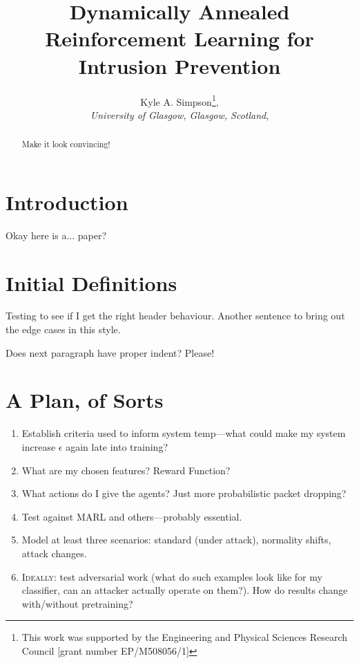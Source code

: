 \documentclass[conference,10pt]{IEEEtran}
\title{Dynamically Annealed Reinforcement Learning for Intrusion Prevention}
\author{Kyle A. Simpson\thanks{This work was supported by the Engineering and Physical Sciences
		Research Council [grant number EP/M508056/1]},\\\emph{University of Glasgow, Glasgow, Scotland},\\
		\email{k.simpson.1@research.gla.ac.uk}}
\date{}
\begin{document}

\maketitle

\begin{abstract}
	Make it look convincing!
\end{abstract}

\section{Introduction}

Okay here is a... paper?

\section{Initial Definitions}

Testing to see if I get the right header behaviour.
Another sentence to bring out the edge cases in this style.

Does next paragraph have proper indent? Please!

\section{A Plan, of Sorts}

\begin{enumerate}
	\item Establish criteria used to inform system temp---what could make my system increase $\epsilon$ again late into training?
	\item What are my chosen features? Reward Function?
	\item What actions do I give the agents? Just more probabilistic packet dropping?
	\item Test against MARL and others---probably essential.
	\item Model at least three scenarios: standard (under attack), normality shifts, attack changes.
	\item \textsc{Ideally:} test adversarial work (what do such examples look like for my classifier, can an attacker actually operate on them?). How do results change with/without pretraining?
\end{enumerate}

\printbibliography
\end{document}
